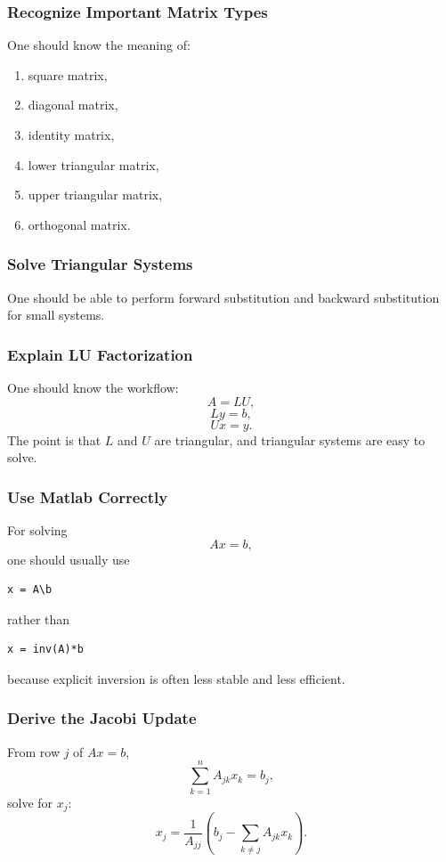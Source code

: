 \documentclass[10pt, letterpaper]{article}
\begin{document}
\subsubsection{Recognize Important Matrix Types}

One should know the meaning of:
\begin{enumerate}
    \item square matrix,
    \item diagonal matrix,
    \item identity matrix,
    \item lower triangular matrix,
    \item upper triangular matrix,
    \item orthogonal matrix.
\end{enumerate}

\subsubsection{Solve Triangular Systems}

One should be able to perform forward substitution and backward substitution for small systems.

\subsubsection{Explain LU Factorization}

One should know the workflow:
\[
A=LU,
\]
\[
Ly=b,
\]
\[
Ux=y.
\]
The point is that \(L\) and \(U\) are triangular, and triangular systems are easy to solve.

\subsubsection{Use Matlab Correctly}

For solving
\[
Ax=b,
\]
one should usually use
\begin{verbatim}
x = A\b
\end{verbatim}
rather than
\begin{verbatim}
x = inv(A)*b
\end{verbatim}
because explicit inversion is often less stable and less efficient.

\subsubsection{Derive the Jacobi Update}

From row \(j\) of \(Ax=b\),
\[
\sum_{k=1}^n A_{jk}x_k=b_j,
\]
solve for \(x_j\):
\[
x_j
=
\frac{1}{A_{jj}}
\left(
b_j-\sum_{k\neq j}A_{jk}x_k
\right).
\]
\end{document}
